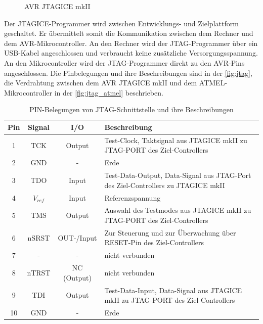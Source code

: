 \begin{figure}[htbp]
	\centering
	\caption[AVR JTAGICE mkII]{AVR JTAGICE mkII \cite{Mikrocontroller:JTAGICE:guide}}\label{fig:jtagicemkII}
\end{figure}

Der JTAGICE-Programmer wird zwischen Entwicklungs- und Zielplattform geschaltet. Er übermittelt somit die Kommunikation zwischen dem Rechner und dem AVR-Mikrocontroller. An den Rechner wird der JTAG-Programmer über ein USB-Kabel angeschlossen und verbraucht keine zusätzliche Versorgungsspannung. An den Mikrocontroller wird der JTAG-Programmer direkt zu den AVR-Pins angeschlossen. Die Pinbelegungen und ihre Beschreibungen sind in der \autoref{fig:jtag}, die Verdrahtung zwischen dem AVR JTAGICE mkII und dem ATMEL-Mikrocontroller in der \autoref{fig:jtag_atmel} beschrieben. 

\begin{table}[htbp]
	\centering
	\begin{tabular}{ |c|c|c|p{9cm}| } \hline
		\textbf{Pin} & \textbf{Signal} & \textbf{I/O} & \textbf{Beschreibung} \\
		\hline
		1 & TCK & Output & Test-Clock, Taktsignal aus JTAGICE mkII zu JTAG-PORT des Ziel-Controllers \\ \hline
		2 & GND & - & Erde \\ \hline
		3 & TDO & Input & Test-Data-Output, Data-Signal aus JTAG-Port des Ziel-Controllers zu JTAGICE mkII \\ \hline
		4 & $V_{ref}$ & Input & Referenzspannung  \\ \hline
		5 & TMS & Output & Auswahl des Testmodes aus JTAGICE mkII zu JTAG-PORT des Ziel-Controllers \\ \hline
		6 & nSRST & OUT-/Input & Zur Steuerung und zur Überwachung über RESET-Pin des Ziel-Controllers\\ \hline
		7 & - & - & nicht verbunden \\ \hline
		8 & nTRST & NC (Output) & nicht verbunden \\ \hline
		9 & TDI & Output &  Test-Data-Input, Data-Signal aus JTAGICE mkII zu JTAG-PORT des Ziel-Controllers \\ \hline
		10 & GND & - & Erde \\ \hline
	\end{tabular}
	\caption{PIN-Belegungen von JTAG-Schnittstelle und ihre Beschreibungen}\label{fig:jtag}
\end{table}

